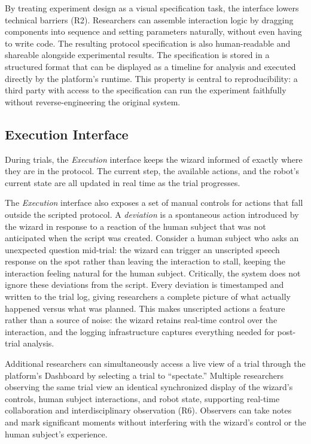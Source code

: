 By treating experiment design as a visual specification task, the interface lowers technical barriers (R2). Researchers can assemble interaction logic by dragging components into sequence and setting parameters naturally, without even having to write code. The resulting protocol specification is also human-readable and shareable alongside experimental results. The specification is stored in a structured format that can be displayed as a timeline for analysis and executed directly by the platform's runtime. This property is central to reproducibility: a third party with access to the specification can run the experiment faithfully without reverse-engineering the original system.

\subsection{Execution Interface}

During trials, the \emph{Execution} interface keeps the wizard informed of exactly where they are in the protocol. The current step, the available actions, and the robot's current state are all updated in real time as the trial progresses.

The \emph{Execution} interface also exposes a set of manual controls for actions that fall outside the scripted protocol. A \emph{deviation} is a spontaneous action introduced by the wizard in response to a reaction of the human subject that was not anticipated when the script was created. Consider a human subject who asks an unexpected question mid-trial: the wizard can trigger an unscripted speech response on the spot rather than leaving the interaction to stall, keeping the interaction feeling natural for the human subject. Critically, the system does not ignore these deviations from the script. Every deviation is timestamped and written to the trial log, giving researchers a complete picture of what actually happened versus what was planned. This makes unscripted actions a feature rather than a source of noise: the wizard retains real-time control over the interaction, and the logging infrastructure captures everything needed for post-trial analysis.

Additional researchers can simultaneously access a live view of a trial through the platform's Dashboard by selecting a trial to ``spectate.'' Multiple researchers observing the same trial view an identical synchronized display of the wizard's controls, human subject interactions, and robot state, supporting real-time collaboration and interdisciplinary observation (R6). Observers can take notes and mark significant moments without interfering with the wizard's control or the human subject's experience.

